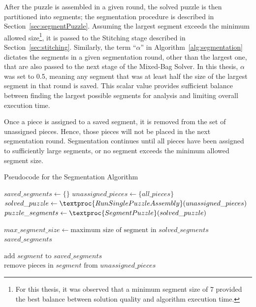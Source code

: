 After the puzzle is assembled in a given round, the solved puzzle is then partitioned into segments; the segmentation procedure is described in Section~\ref{sec:segmentPuzzle}.  Assuming the largest segment exceeds the minimum allowed size\footnote{For this thesis, it was observed that a minimum segment size of 7 provided the best balance between solution quality and algorithm execution time.}, it is passed to the Stitching stage described in Section~\ref{sec:stitching}.  Similarly, the term ``\textit{$\alpha$}'' in Algorithm~\ref{alg:segmentation} dictates the segments in a given segmentation round, other than the largest one, that are also passed to the next stage of the Mixed-Bag Solver.  In this thesis, \textit{$\alpha$} was set to 0.5, meaning any segment that was at least half the size of the largest segment in that round is saved.  This scalar value provides sufficient balance between finding the largest possible segments for analysis and limiting overall execution time.

Once a piece is assigned to a saved segment, it is removed from the set of unassigned pieces.  Hence, those pieces will not be placed in the next segmentation round.  Segmentation continues until all pieces have been assigned to sufficiently large segments, or no segment exceeds the minimum allowed segment size.

\begin{algorithm}[tb]
\caption{Pseudocode for the Segmentation Algorithm}\label{alg:segmentation}
\begin{algorithmic}[1]
    \State $saved\_segments \gets \{ \}$
    \State $unassigned\_pieces \gets \{ all\_pieces \}$
    \Loop
        \State $solved\_puzzle \gets \textproc{RunSinglePuzzleAssembly}(unassigned\_pieces)$
        \State $puzzle\_segments \gets \textproc{SegmentPuzzle}(solved\_puzzle)$
\item[]
        \State $max\_segment\_size \gets \text{maximum size of segment in } solved\_segments$
			\State \Return $saved\_segments$
        \EndIf
\item[]
                \State $\text{add } segment \text{ to } saved\_segments$
                \State $\text{remove pieces in } segment \text{ from } unassigned\_pieces$
            \EndIf
        \EndFor
	\EndLoop
\EndFunction
\end{algorithmic}
\end{algorithm}


